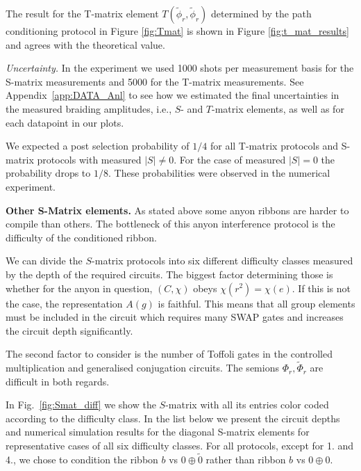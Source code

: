 \documentclass[a4paper,twocolumn,11pt, accepted=2024-06-14]{quantumarticle}
\begin{document}
The result for the T-matrix element $T(\tilde \phi_r, \tilde \phi_r)$ determined by the path conditioning protocol in Figure \ref{fig:Tmat} is shown in Figure \ref{fig:t_mat_results} and agrees with the theoretical value.



\emph{Uncertainty.} In the experiment we used 1000 shots per measurement basis for the S-matrix measurements and 5000 for the T-matrix measurements. See Appendix~\ref{app:DATA_Anl} to see how we estimated the final uncertainties in the measured braiding amplitudes, i.e., $S$- and $T$-matrix elements, as well as for each datapoint in our plots.

We expected a post selection probability of $1/4$ for all T-matrix protocols and S-matrix protocols with measured $|S| \neq 0$. For the case of measured $|S| = 0$ the probability drops to $1/8$. These probabilities were observed in the numerical experiment.

\textbf{Other S-Matrix elements.}
As stated above some anyon ribbons are harder to compile than others. The bottleneck of this anyon interference protocol is the difficulty of the conditioned ribbon. 

We can divide the $S$-matrix protocols into six different difficulty classes measured by the depth of the required circuits. The biggest factor determining those is whether for the anyon in question, $(C, \chi)$ obeys $\chi(r^2) = \chi(e)$. If this is not the case, the representation $A{(g)}$ is faithful. This means that all group elements must be included in the circuit which requires many SWAP gates and increases the circuit depth significantly.

The second factor to consider is the number of Toffoli gates in the controlled multiplication and generalised conjugation circuits. The semions $\Phi_r,\tilde \Phi_r$ are difficult in both regards. 

In Fig.~\ref{fig:Smat_diff} we show the $S$-matrix with all its entries color coded according to the difficulty class. In the list below we present the circuit depths and numerical simulation results for the diagonal S-matrix elements for representative cases of all six difficulty classes. For all protocols, except for 1. and 4., we chose to condition the ribbon $b$ vs $0\oplus \tilde 0$ rather than ribbon $b$ vs $0 \oplus 0$.
\end{document}
